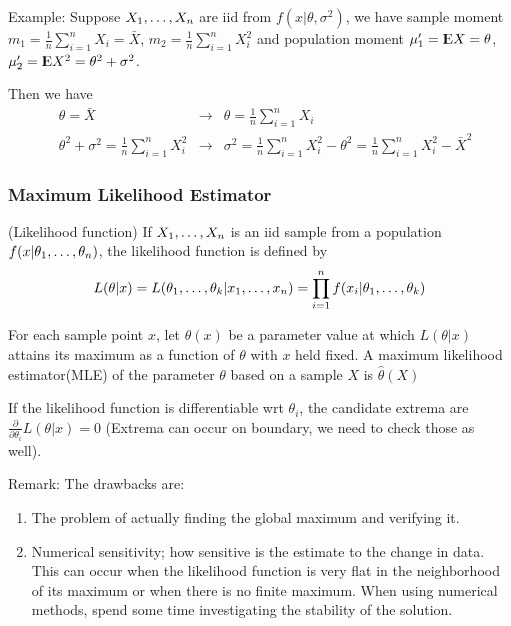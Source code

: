 \documentclass[12pt]{article}
\begin{document}
Example: Suppose $\varvec{X}$ are iid from $f(x|\theta, \sigma^2)$, we have sample moment $m_1 = \frac{1}{n}\sum^n_{i=1}X_i = \bar{X}$, $m_2 = \frac{1}{n} \sum^n_{i=1}X_i^2$ and population moment $\mu_1' = \E X = \theta$,  $\mu_2' = \E X^2 = \theta^2 + \sigma^2$.

Then we have \begin{align*}
  &\theta = \bar{X} &\rightarrow &\theta = \frac{1}{n}\sum^n_{i=1}X_i  \\
  &\theta^2 + \sigma^2 =  \frac{1}{n} \sum^n_{i=1}X_i^2 
  &\rightarrow &\sigma^2 = \frac{1}{n} \sum^n_{i=1}X_i^2 - \theta^2  = \frac{1}{n} \sum^n_{i=1}X_i^2 - \bar{X}^2
\end{align*}

\subsubsection{Maximum Likelihood Estimator}
\begin{definition}(Likelihood function)
	If $\varvec{X}$ is an iid sample from a population $f(x|\varvec{\theta})$, the likelihood function is defined by $$
	 L(\theta|x) = L(\varvec[k]{\theta} | \varvec{x}) = \prod^n_{i=1} f(x_i | \varvec[k]{\theta})
	$$
\end{definition}

\begin{definition}
	For each sample point $x$, let $\hat{\theta}(x)$ be a parameter value at which $L(\theta| x)$ attains its maximum as a function of $\theta$ with $x$ held fixed. A maximum likelihood estimator(MLE) of the parameter $\theta$ based on a sample $X$ is $\hat{\theta}(X)$
\end{definition}

If the likelihood function is differentiable wrt $\theta_i$, the candidate extrema are $\frac{\partial}{\partial \theta_i}L(\theta |x) = 0$ (Extrema can occur on boundary, we need to check those as well).

Remark: The drawbacks are: \begin{enumerate}
	\item The problem of actually finding the global maximum and verifying it.
	\item Numerical sensitivity; how sensitive is the estimate to the change in data. This can occur when the likelihood function is very flat in the neighborhood of its maximum or when there is no finite maximum. When using numerical methods, spend some time investigating the stability of the solution.
\end{enumerate}
\end{document}
